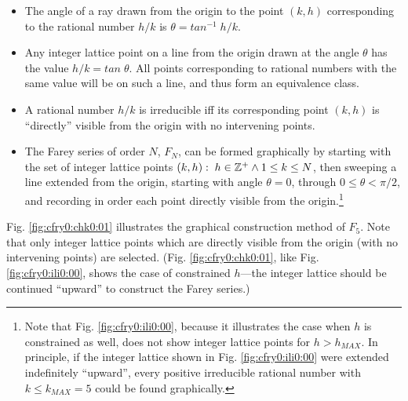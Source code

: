 \begin{itemize}
   \item The angle of a ray drawn from the origin to the point
         $(k,h)$ corresponding to the rational number $h/k$ is
         $\theta = tan^{-1} \; h/k$.

   \item Any integer lattice point on a line from 
         the origin drawn at the angle $\theta$
         has the value $h/k = tan \; \theta$.  All points corresponding
         to rational numbers with the same value will be on such a line,
         and thus form an equivalence class.

   \item A rational number $h/k$ is irreducible iff its corresponding
         point $(k,h)$ is ``directly'' visible from the origin with
         no intervening points.

   \item The Farey series of order $N$, $F_N$, can be 
         formed graphically by starting with the
		 set of integer lattice points
		 $(k,h): \; h \in {\mathbb{Z}^+} \wedge 1 \leq k \leq N$, 
		 then sweeping
         a line extended from the origin, starting with 
         angle $\theta = 0$, through
         $0 \leq \theta < \pi{}/2$, and recording 
         in order each point directly visible from
         the origin.\footnote{Note that Fig. \ref{fig:cfry0:ili0:00},
         because it illustrates the case when $h$ is constrained
         as well, does not show integer lattice points for
         $h > h_{MAX}$.  In principle, if the integer lattice shown
         in Fig. \ref{fig:cfry0:ili0:00} were extended indefinitely
         ``upward'', every positive irreducible rational number with
         $k \leq k_{MAX} = 5$ could be found graphically.}
\end{itemize}

Fig. \ref{fig:cfry0:chk0:01} illustrates the graphical construction method
of $F_5$.  Note that only integer lattice points which are directly
visible from the origin (with no intervening points) are selected.
(Fig. \ref{fig:cfry0:chk0:01}, like Fig. \ref{fig:cfry0:ili0:00},
shows the case of constrained $h$---the integer lattice should be
continued ``upward'' to construct the Farey series.)

